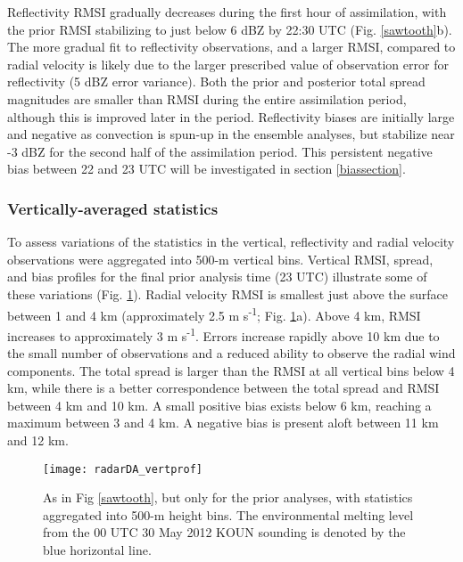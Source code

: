 Reflectivity RMSI gradually decreases during the first hour of assimilation, with the prior RMSI stabilizing to just below 6 dBZ by 22:30 UTC (Fig. \ref{sawtooth}b). The more gradual fit to reflectivity observations, and a larger RMSI, compared to radial velocity is likely due to the larger prescribed value of observation error for reflectivity (5 dBZ error variance). Both the prior and posterior total spread magnitudes are smaller than RMSI during the entire assimilation period, although this is improved later in the period. Reflectivity biases are initially large and negative as convection is spun-up in the ensemble analyses, but stabilize near -3 dBZ for the second half of the assimilation period. This persistent negative bias between 22 and 23 UTC will be investigated in section \ref{biassection}.

\subsubsection{Vertically-averaged statistics}
To assess variations of the statistics in the vertical, reflectivity and radial velocity observations were aggregated into 500-m vertical bins. Vertical RMSI, spread, and bias profiles for the final prior analysis time (23 UTC) illustrate some of these variations (Fig. \ref{vertprof}). Radial velocity RMSI is smallest just above the surface between 1 and 4 km (approximately 2.5 m s\textsuperscript{-1}; Fig. \ref{vertprof}a). Above 4 km, RMSI increases to approximately 3 m s\textsuperscript{-1}. Errors increase rapidly above 10 km due to the small number of observations and a reduced ability to observe the radial wind components. The total spread is larger than the RMSI at all vertical bins below 4 km, while there is a better correspondence between the total spread and RMSI between 4 km and 10 km. A small positive bias exists below 6 km, reaching a maximum between 3 and 4 km. A negative bias is present aloft between 11 km and 12 km.

\begin{figure}
\centering
\texttt{[image: radarDA\_vertprof]}
\caption{As in Fig \ref{sawtooth}, but only for the prior analyses, with statistics aggregated into 500-m height bins. The environmental melting level from the 00 UTC 30 May 2012 KOUN sounding is denoted by the blue horizontal line.}
\label{vertprof}
\end{figure}

